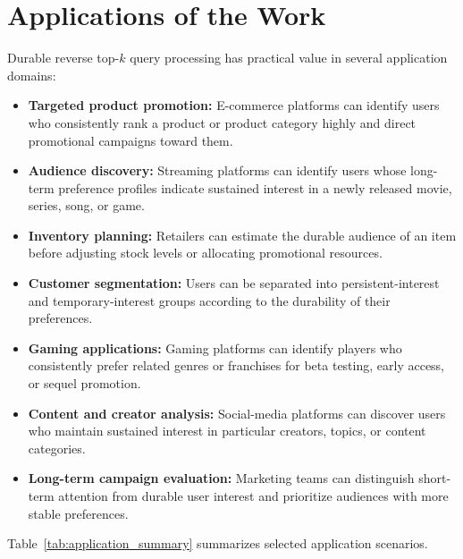 
\section{Applications of the Work}
\label{sec:applications}

Durable reverse top-$k$ query processing has practical value in several application domains:

\begin{itemize}

\item \textbf{Targeted product promotion:}
E-commerce platforms can identify users who consistently rank a product or product category highly and direct promotional campaigns toward them.

\item \textbf{Audience discovery:}
Streaming platforms can identify users whose long-term preference profiles indicate sustained interest in a newly released movie, series, song, or game.

\item \textbf{Inventory planning:}
Retailers can estimate the durable audience of an item before adjusting stock levels or allocating promotional resources.

\item \textbf{Customer segmentation:}
Users can be separated into persistent-interest and temporary-interest groups according to the durability of their preferences.

\item \textbf{Gaming applications:}
Gaming platforms can identify players who consistently prefer related genres or franchises for beta testing, early access, or sequel promotion.

\item \textbf{Content and creator analysis:}
Social-media platforms can discover users who maintain sustained interest in particular creators, topics, or content categories.

\item \textbf{Long-term campaign evaluation:}
Marketing teams can distinguish short-term attention from durable user interest and prioritize audiences with more stable preferences.

\end{itemize}

Table~\ref{tab:application_summary} summarizes selected application scenarios.

